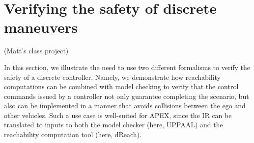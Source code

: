 \section{Verifying the safety of discrete maneuvers}
\label{verifyingSafety}
(Matt's class project)

In this section, we illustrate the need to use two different formalisms to verify the safety of a discrete controller. 
Namely, we demonstrate how reachability computations can be combined with model checking to verify that the control commands issued by a controller not only guarantee completing the scenario, but also can be implemented in a manner that avoids collisions between the ego and other vehicles.
Such a use case is well-suited for APEX, since the IR can be translated to inputs to both the model checker (here, UPPAAL) and the reachability computation tool (here, dReach).

